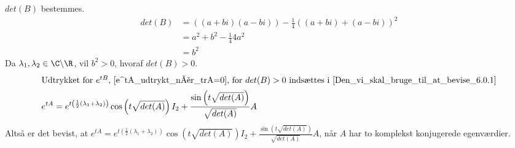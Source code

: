 \begin{bev}
\begin{itemize}
    $det(B)$ bestemmes. 
    \begin{align*}
        det(B) &=\left(\left(a+bi\right)\left(a-bi\right)\right) - \frac{1}{4}\left((a+bi)+(a-bi)\right)^2\\
        &= a^2+b^2-\frac{1}{4}4a^2 \\
        &= b^2
    \end{align*} 
    Da $\lambda_1,\lambda_2\in \C\backslash\R$, vil $b^2>0$, hvoraf $det(B)>0$.
    \begin{align*}
     \intertext{Udtrykket for $e^{tB}$, \autoref{e^tA_udtrykt_når_trA=0}, for $det(B)>0$ indsættes i \eqref{Den_vi_skal_bruge_til_at_bevise_6.0.1}}
     e^{tA} &= e^{t\left(\frac{1}{2}(\lambda_1+\lambda_2)\right)} \cos\left(t\sqrt{det(A)}\right)I_2+\frac{\sin\left(t\sqrt{det(A)}\right)}{\sqrt{det(A)}}A
     \end{align*}
    Altså er det bevist, at $e^{tA} = e^{t\left(\frac{1}{2}(\lambda_1+\lambda_2)\right)} \cos\left(t\sqrt{det(A)}\right)I_2+\frac{\sin\left(t\sqrt{det(A)}\right)}{\sqrt{det(A)}}A$, når $A$ har to komplekst konjugerede egenværdier. 
\end{itemize}
\end{bev}
